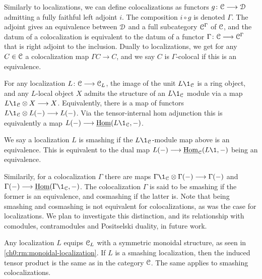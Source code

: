 \begin{remark}
    Similarly to localizations, we can define { colocalizations} as functors $g\colon \EuScript{C}\longrightarrow \EuScript{D}$ admitting a fully faithful left adjoint $i$. The composition $i\circ g$ is denoted $\Gamma$. The adjoint gives an equivalence between $\EuScript{D}$ and a full subcategory $\EuScript{C}^\Gamma$ of $\EuScript{C}$, and the datum of a colocalization is equivalent to the datum of a functor $\Gamma\colon \EuScript{C}\longrightarrow \EuScript{C}^\Gamma$ that is right adjoint to the inclusion. 
    Dually to localizations, we get for any $C\in \EuScript{C}$ a colocalization map $\Gamma C\to C$, and we say $C$ is $\Gamma$-colocal if this is an equivalence. 
\end{remark}

For any localization $L\colon \EuScript{C}\longrightarrow \EuScript{C}_L$, the image of the unit $L\1_\C$ is a ring object, and any $L$-local object $X$ admits the structure of an $L\1_\C$ module via a map $L\1_\C\otimes X \longrightarrow X$. Equivalently, there is a map of functors $L\1_\C \otimes L(-)\longrightarrow L(-)$. Via the tensor-internal hom adjunction this is equivalently a map $L(-)\longrightarrow \iHom(L\1_\C,-)$. 

\begin{definition}
    \label{ch0:def:smashing-localization}
    We say a localization $L$ is { smashing} if the $L\1_\C$-module map above is an equivalence. This is equivalent to the dual map $L(-)\longrightarrow \iHom_\C(L\1, -)$ being an equivalence. 
\end{definition}

\begin{remark}
    Similarily, for a colocalization $\Gamma$ there are maps $\Gamma \1_\C \otimes \Gamma(-)\longrightarrow \Gamma (-)$ and $\Gamma(-)\longrightarrow \iHom(\Gamma \1_\C, -)$. The colocalization $\Gamma$ is said to be smashing if the former is an equivalence, and { cosmashing} if the latter is. Note that being smashing and cosmashing is not equivalent for colocalizations, as was the case for localizations. We plan to investigate this distinction, and its relationship with comodules, contramodules and Positselski duality, in future work. 
\end{remark}

\begin{remark}
    Any localization $L$ equips $\EuScript{C}_L$ with a symmetric monoidal structure, as seen in \cref{ch0:rm:monoidal-localization}. If $L$ is a smashing localization, then the induced tensor product is the same as in the category $\EuScript{C}$. The same applies to smashing colocalizations. 
\end{remark}

